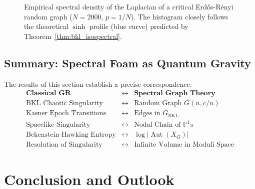 \documentclass[12pt]{article}
\theoremstyle{definition}
\DeclareMathOperator{\Aut}{Aut}
\begin{document}
\begin{figure}[H]
\centering
{}
\caption{Empirical spectral density of the Laplacian of a critical Erd\H{o}s-R\'enyi random graph ($N=2000$, $p=1/N$). The histogram closely follows the theoretical $\sinh$ profile (blue curve) predicted by Theorem~\ref{thm:bkl_isospectral}.}
\label{fig:spectral_histogram}
\end{figure}

\subsection{Summary: Spectral Foam as Quantum Gravity}
The results of this section establish a precise correspondence:
\[
\boxed{
\begin{array}{ccc}
\textbf{Classical GR} & \longleftrightarrow & \textbf{Spectral Graph Theory} \\
\hline
\text{BKL Chaotic Singularity} & \longleftrightarrow & \text{Random Graph } G(n, c/n) \\
\text{Kasner Epoch Transitions} & \longleftrightarrow & \text{Edges in } G_{\text{BKL}} \\
\text{Spacelike Singularity} & \longleftrightarrow & \text{Nodal Chain of } \mathbb{P}^1\text{s} \\
\text{Bekenstein-Hawking Entropy} & \longleftrightarrow & \log|\Aut(X_G)| \\
\text{Resolution of Singularity} & \longleftrightarrow & \text{Infinite Volume in Moduli Space}
\end{array}
}
\]

\section{Conclusion and Outlook}
\end{document}
